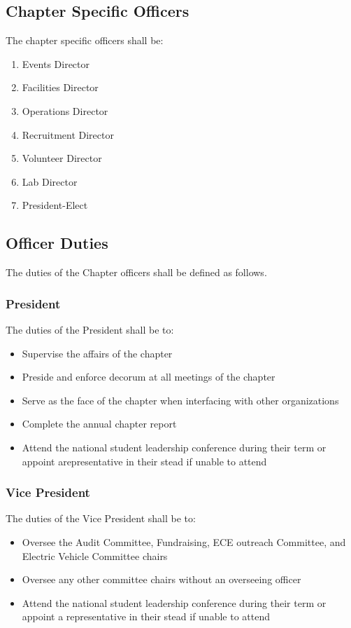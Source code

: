 \documentclass[10pt, oneside]{article}
\begin{document}
\subsection{Chapter Specific Officers}
The chapter specific officers shall be:
\begin{enumerate}[label=\alph*.]
\item Events Director
\item Facilities Director
\item Operations Director
\item Recruitment Director
\item Volunteer Director
\item Lab Director
\item President-Elect
\end{enumerate}
\subsection{Officer Duties}
The duties of the Chapter officers shall be defined as follows.
\subsubsection{President}
The duties of the President shall be to:
\begin{itemize}
\item Supervise the affairs of the chapter
\item Preside and enforce decorum at all meetings of the chapter
\item Serve as the face of the chapter when interfacing with other organizations
\item Complete the annual chapter report
\item Attend the national student leadership conference during their term or
appoint arepresentative in their stead if unable to attend
\end{itemize}
\subsubsection{Vice President}
The duties of the Vice President shall be to:
\begin{itemize}
\item Oversee the Audit Committee, Fundraising, ECE outreach Committee, and Electric Vehicle Committee chairs
\item Oversee any other committee chairs without an overseeing officer
\item Attend the national student leadership conference during their term or
appoint a representative in their stead if unable to attend
\end{itemize}
\end{document}
